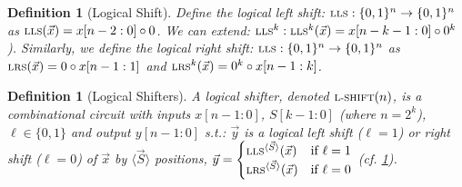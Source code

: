 \documentclass[12pt]{article}
\newcommand{\scr}[1]{{\scriptstyle\textup{#1}}}
\newcommand*{\B}{\{0,1\}}
\newcommand{\repr}[1]{\langle{#1}\rangle}
\newtheorem{definition}[theorem]{Definition}
\begin{document}
\begin{definition}[Logical Shift]
  \label{logi_shift}
  Define the logical left shift: $\scr{LLS}:\B^n\to\B^n$ as $\scr{LLS}(\vec{x})=x[n-2:0]\circ 0$. We can extend: $\scr{LLS}^k:\scr{LLS}^k(\vec{x})=x[n-k-1:0]\circ 0^k$). Similarly, we define the logical right shift: $\scr{LLS}:\B^n\to\B^n$ as $\scr{LRS}(\vec{x})=0\circ x[n-1:1]$ and $\scr{LRS}^k(\vec{x})=0^k\circ x[n-1:k]$.
\end{definition}

\begin{definition}[Logical Shifters]
  A logical shifter, denoted $\scr{L-SHIFT}(n)$, is a combinational circuit with inputs $x[n-1:0]$, $S[k-1:0]$ (where $n=2^k$), $\ell\in\B$ and output $y[n-1:0]$ s.t.: $\vec{y}$ is a logical left shift ($\ell=1$) or right shift ($\ell=0$) of $\vec{x}$ by $\repr{\vec{S}}$ positions, $\vec{y}=\begin{cases}\scr{LLS}^{\repr{\vec{S}}}(\vec{x})&\text{if }\ell=1\\\scr{LRS}^{\repr{\vec{S}}}(\vec{x})&\text{if }\ell=0\end{cases}$ (cf. \ref{logi_shift}).
\end{definition}
\end{document}
